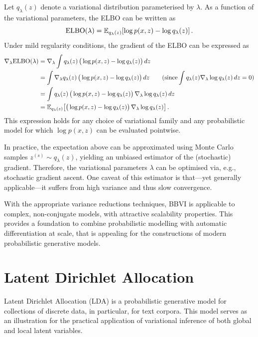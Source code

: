 Let $q_\lambda(z)$ denote a variational distribution parameterised by $\lambda$. As a function of the variational parameters, the
ELBO can be written as
\[
{\text{ELBO}}(\lambda)
=
\mathbb{E}_{q_\lambda(z)}\!\left[\log p(x,z)-\log q_\lambda(z)\right].
\]
Under mild regularity conditions, the gradient of the ELBO can be expressed as
\begin{align}
\nabla_\lambda {\text{ELBO}}(\lambda)
&=
\nabla_\lambda \int q_\lambda(z)\,\big(\log p(x,z)-\log q_\lambda(z)\big)\,dz
\nonumber\\
&=
\int \nabla_\lambda q_\lambda(z)\,\big(\log p(x,z)-\log q_\lambda(z)\big)\,dz
\qquad (\text{since} \int q_\lambda(z)\nabla_\lambda \log q_\lambda(z)\,dz = 0)
\nonumber\\
&=
\int q_\lambda(z)\,\big(\log p(x,z)-\log q_\lambda(z)\big)\,\nabla_\lambda \log q_\lambda(z)\,dz
\nonumber\\
&=
\mathbb{E}_{q_\lambda(z)}\!\left[
\big(\log p(x,z)-\log q_\lambda(z)\big)\,\nabla_\lambda \log q_\lambda(z)
\right].
\end{align}
This expression holds for any choice of variational family and any probabilistic model
for which $\log p(x,z)$ can be evaluated pointwise.

In practice, the expectation above can be approximated using Monte Carlo samples
$z^{(s)}\sim q_\lambda(z)$, yielding an unbiased estimator of the (stochastic) gradient. Therefore, the variational parameters $\lambda$ can be optimised via, e.g., stochastic gradient ascent. One caveat of this estimator is that---yet generally applicable---it suffers from high variance and thus slow convergence.

With the appropriate variance reductions techniques, BBVI is applicable to complex, non-conjugate models, with attractive scalability properties. This provides a foundation to combine probabilistic modelling with automatic differentiation at scale, that is appealing for the constructions of modern probabilistic generative models.


\section{Latent Dirichlet Allocation}

Latent Dirichlet Allocation (LDA) is a probabilistic generative model for collections of discrete data, in particular, for text corpora. This model serves as an illustration for the practical application of variational inference of both global and local latent variables.

